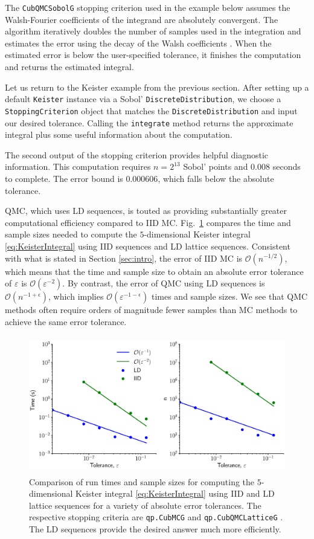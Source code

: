 \documentclass[graybox]{svmult}
\begin{document}
The \texttt{CubQMCSobolG} stopping criterion used in the example below assumes the Walsh-Fourier coefficients of the integrand are absolutely convergent. The algorithm iteratively doubles the number of samples used in the integration and estimates the error using the decay of the Walsh coefficients \cite{HicJim16a}. When the estimated error is below the user-specified tolerance, it finishes the computation and returns the estimated integral.

Let us return to the Keister example from the previous section.  After setting up  a default \texttt{Keister} instance via a Sobol' \texttt{DiscreteDistribution}, we choose a \texttt{StoppingCriterion} object that matches the \texttt{DiscreteDistribution} and input our desired tolerance.  Calling the  \texttt{integrate} method returns the approximate integral plus some useful information about the computation.

The second output of the stopping criterion provides helpful diagnostic information.  This computation requires $n=2^{13}$ Sobol' points and $0.008$ seconds to complete.  The error bound is $0.000606$, which falls below the absolute tolerance.

QMC, which uses LD sequences, is touted as providing substantially greater computational efficiency compared to IID MC.
Fig.~\ref{fig:sc_comp} compares the time and sample sizes needed to compute the $5$-dimensional Keister integral \eqref{eq:KeisterIntegral} using IID sequences and LD lattice sequences. Consistent with what is stated in Section \ref{sec:intro}, the error of IID MC is $\mathcal{O}(n^{-1/2})$, which means that the time and sample size to obtain an absolute error tolerance of $\varepsilon$ is $\mathcal{O}(\varepsilon^{-2})$.  By contrast, the  error of QMC using LD sequences is $\mathcal{O}(n^{-1+\epsilon})$, which implies $\mathcal{O}(\varepsilon^{-1-\epsilon})$ times and sample sizes.  We see that QMC methods often require orders of magnitude fewer samples than MC methods to achieve the same error tolerance.

\begin{figure}[t]
	\includegraphics[height=6cm]{QMCSoftwareArticle/vfigs/sc_comp.eps}
	\caption{Comparison of run times and sample sizes for computing the $5$-dimensional Keister integral \eqref{eq:KeisterIntegral} using IID and LD lattice sequences for a variety of absolute error tolerances. The respective stopping criteria are  \texttt{qp.CubMCG} \cite{HicEtal14a} and  \texttt{qp.CubQMCLatticeG} \cite{JimHic16a}. The LD sequences provide the desired answer much more efficiently.}
	\label{fig:sc_comp}
\end{figure}
\end{document}
